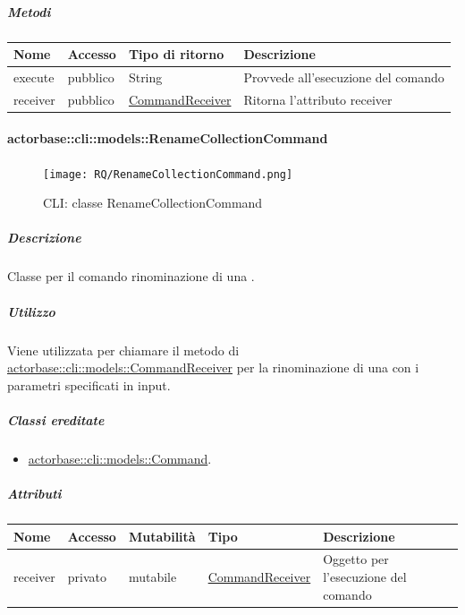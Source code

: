 \documentclass{scalatekids-article}
\begin{document}
\subparagraph{Metodi}

\begin{tabular}{| p{3cm} | p{1.5cm} | p{3.5cm} | p{9cm} |}
  \hline
  Nome & Accesso & Tipo di ritorno & Descrizione\\
  \hline
  execute & pubblico & String & Provvede all'esecuzione del comando\\
  \hline
  receiver & pubblico & \hyperref[sec:actorbase::cli::models::CommandReceiver]{CommandReceiver} & Ritorna l'attributo receiver\\
  \hline
\end{tabular}

\paragraph{actorbase::cli::models::RenameCollectionCommand}
\label{sec:actorbase::cli::models::RenameCollectionCommand}

\begin{figure}[H]
  \begin{center}
    \texttt{[image: RQ/RenameCollectionCommand.png]}
    \caption{CLI: classe RenameCollectionCommand}
  \end{center}
\end{figure}

\subparagraph{Descrizione}

Classe per il comando rinominazione di una .

\subparagraph{Utilizzo}

Viene utilizzata per chiamare il metodo di \hyperref[sec:actorbase::cli::models::CommandReceiver]{actorbase::cli::models::CommandReceiver} per la rinominazione di una  con i parametri specificati in input.

\subparagraph{Classi ereditate}

\begin{itemize}
\item \hyperref[sec:actorbase::cli::models::Command]{actorbase::cli::models::Command}.
\end{itemize}

\subparagraph{Attributi}

\begin{tabular}{| p{1cm} | p{1.5cm} | p{2cm} | p{4cm} | p{8.5cm} |}
  \hline
  Nome & Accesso & Mutabilità & Tipo & Descrizione\\
  \hline
  receiver & privato & mutabile & \hyperref[sec:actorbase::cli::models::CommandReceiver]{CommandReceiver} & Oggetto per l'esecuzione del comando\\
  \hline
\end{tabular}
\end{document}
